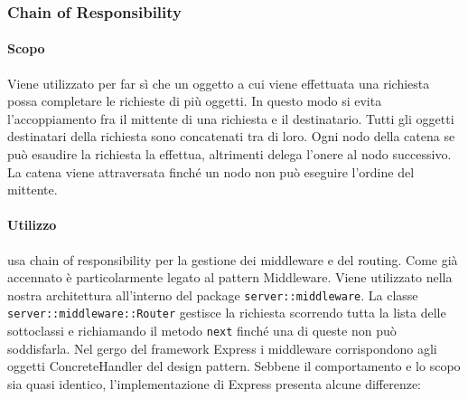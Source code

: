 \documentclass[12pt,a4paper]{article}
\begin{document}
\subsubsection{Chain of Responsibility}

\paragraph{Scopo}
Viene utilizzato per far sì che un oggetto a cui viene effettuata una richiesta possa completare le richieste di più oggetti. In questo modo si evita l’accoppiamento fra il mittente di una richiesta e il destinatario. Tutti gli oggetti destinatari della richiesta sono concatenati tra di loro. Ogni nodo della catena se può esaudire la richiesta la effettua, altrimenti delega l’onere al nodo successivo. La catena viene attraversata finché un nodo non può eseguire l’ordine del mittente.

\paragraph{Utilizzo}
 usa chain of responsibility per la gestione dei middleware e del routing. Come già accennato è particolarmente legato al pattern Middleware. Viene utilizzato nella nostra architettura all’interno del package \texttt{server::middleware}. La classe \texttt{server::middleware::Router} gestisce la richiesta scorrendo tutta la lista delle sottoclassi e richiamando il metodo \texttt{next} finché una di queste non può soddisfarla. Nel gergo del framework Express i middleware corrispondono agli oggetti ConcreteHandler del design pattern. Sebbene il comportamento e lo scopo sia quasi identico, l’implementazione di Express presenta alcune differenze:
\end{document}
